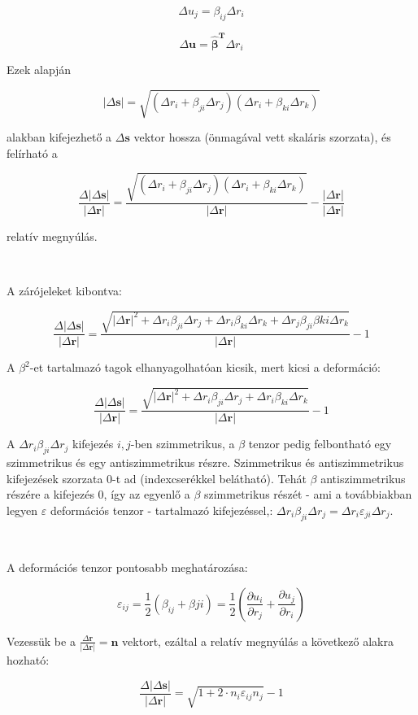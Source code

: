 \documentclass[a4paper, 12pt]{article}
\begin{document}
$$\Delta u_j=\beta_{ij}\Delta r_i$$

$$\Delta \mathbf{u}=\mathbf{\hat\beta^{T}}\Delta r_i$$

Ezek alapján

$$|\Delta\mathbf{s}|=\sqrt{(\Delta r_i+\beta_{ji}\Delta r_j)(\Delta r_i+\beta_{ki}\Delta r_k)}$$

alakban kifejezhető a $\Delta\mathbf{s}$ vektor hossza (önmagával vett skaláris szorzata), és felírható a

$$\frac{\Delta|\Delta\mathbf{s}|}{|\Delta\mathbf{r}|}=\frac{\sqrt{(\Delta r_i+\beta_{ji}\Delta r_j)(\Delta r_i+\beta_{ki}\Delta r_k)}}{|\Delta\mathbf{r}|}-\frac{|\Delta\mathbf{r}|}{|\Delta\mathbf{r}|}$$

relatív megnyúlás. 

~

A zárójeleket kibontva:

$$\frac{\Delta|\Delta\mathbf{s}|}{|\Delta\mathbf{r}|}=\frac{\sqrt{|\Delta\mathbf{r}|^2+\Delta r_i\beta_{ji}\Delta r_j+\Delta r_i\beta_{ki}\Delta r_k+\Delta r_j\beta_{ji}\beta{ki}\Delta r_k}}{|\Delta\mathbf{r}|}-1$$

A $\beta^2$-et tartalmazó tagok elhanyagolhatóan kicsik, mert kicsi a deformáció:

$$\frac{\Delta|\Delta\mathbf{s}|}{|\Delta\mathbf{r}|}=\frac{\sqrt{|\Delta\mathbf{r}|^2+\Delta r_i\beta_{ji}\Delta r_j+\Delta r_i\beta_{ki}\Delta r_k}}{|\Delta\mathbf{r}|}-1$$

A $\Delta r_i\beta_{ji}\Delta r_j$ kifejezés $i,j$-ben szimmetrikus, a $\beta$ tenzor pedig felbontható egy szimmetrikus és egy antiszimmetrikus részre. Szimmetrikus és antiszimmetrikus kifejezések szorzata $0$-t ad (indexcserékkel belátható). Tehát $\beta$ antiszimmetrikus részére a kifejezés $0$, így az egyenlő a $\beta$ szimmetrikus részét - ami a továbbiakban legyen $\varepsilon$ deformációs tenzor - tartalmazó kifejezéssel,: $\Delta r_i\beta_{ji}\Delta r_j=\Delta r_i\varepsilon_{ji}\Delta r_j$. 

~

A deformációs tenzor pontosabb meghatározása:

$$\varepsilon_{ij}=\frac12(\beta_{ij}+\beta{ji})=\frac12\left(\frac{\partial u_i}{\partial r_j}+\frac{\partial u_j}{\partial r_i}\right)$$

Vezessük be a $\frac{\Delta\mathbf{r}}{|\Delta\mathbf{r}|}=\mathbf{n}$ vektort, ezáltal a relatív megnyúlás a következő alakra hozható:

$$\frac{\Delta|\Delta\mathbf{s}|}{|\Delta\mathbf{r}|}=\sqrt{1+2\cdot n_i\varepsilon_{ij}n_j}-1$$
\end{document}
